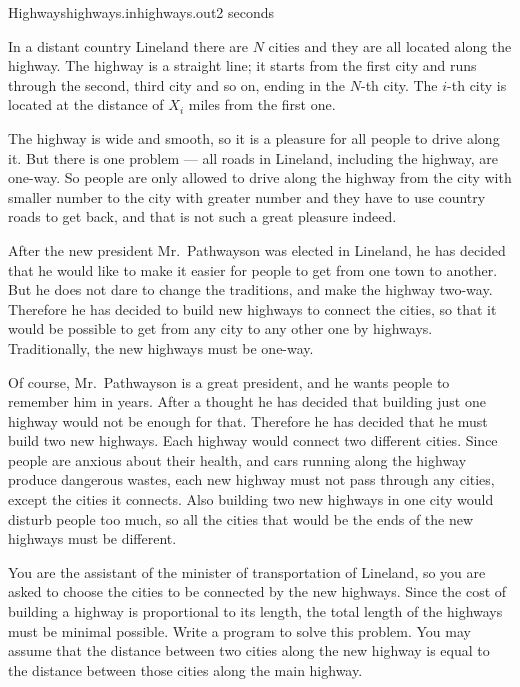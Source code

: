 \begin{problem}{Highways}{highways.in}{highways.out}{2 seconds}

In a distant country Lineland there are $N$ cities and they are all
located along the highway. The highway is a straight line; it
starts from the first city and runs through the second, third city
and so on, ending in the $N$-th city. The $i$-th city is located at
the distance of $X_i$ miles from the first one.

The highway is wide and smooth, so it is a pleasure for all people
to drive along it. But there is one problem --- all roads in Lineland, including
the highway, are one-way.
So people are only allowed to drive along the highway from the city with
smaller number to the city with greater number and they have to use
country roads to get back, and that is not such a great pleasure indeed.

After the new president Mr.~Pathwayson was elected in Lineland, he has
decided that he would like to make it easier for people to get from one 
town to another. But he does not dare to change the traditions, and make 
the highway two-way. Therefore he has decided to build new highways 
to connect the cities, so that it would be possible to get from any city 
to any other one by highways.
Traditionally, the new highways must be one-way.

Of course, Mr.~Pathwayson is a great president, and he wants people to 
remember him in years. After a thought he has decided that building just 
one highway would not be enough for that. Therefore he has decided that 
he must build two new highways. Each highway would connect two different 
cities. Since people are anxious about their health, and cars running
along the highway produce dangerous wastes, each new highway must not 
pass through any cities, except the cities it connects. Also building two 
new highways in one city would disturb people too much, so all the cities 
that would be the ends of the new highways must be different.

You are the assistant of the minister of transportation of Lineland, so
you are asked to choose the cities to be connected by the new highways.
Since the cost of building a highway is proportional to its length, the
total length of the highways must be minimal possible. Write a program
to solve this problem. You may assume that the distance between two cities
along the new highway is equal to the distance between those cities along
the main highway.

\InputFile


\end{problem}
